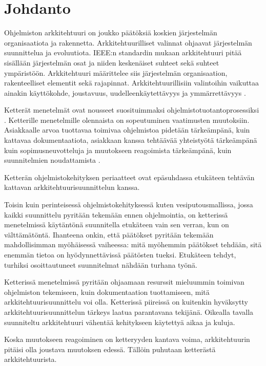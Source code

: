 \chapter{Johdanto}


Ohjelmiston arkkitehtuuri on joukko päätöksiä koskien järjestelmän organisaatiota ja rakennetta. Arkkitehtuurilliset valinnat ohjaavat järjestelmän suunnittelua ja evoluutiota. IEEE:n standardin\citep{jen_working_2000} mukaan arkkitehtuuri pitää sisällään järjestelmän osat ja niiden keskenäiset suhteet sekä suhteet ympäristöön. Arkkitehtuuri määrittelee siis järjestelmän organisaation, rakenteelliset elementit sekä rajapinnat. Arkkitehtuurillisiin valintoihin vaikuttaa ainakin käyttökohde, joustavuus, uudelleenkäytettävyys ja ymmärrettävyys \citep{kruchten2004rational}.

Ketterät menetelmät ovat nousseet suosituimmaksi ohjelmistotuotantoprosessiksi \citep{noauthor_14th_2020}. Ketterille menetelmille olennaista on sopeutuminen vaatimusten muutoksiin. Asiakkaalle arvoa tuottavaa toimivaa ohjelmistoa pidetään tärkeämpänä, kuin kattavaa dokumentaatiota, asiakkaan kanssa tehtäävää yhteistyötä tärkeämpänä kuin sopimusneuvotteluja ja muutokseen reagoimista tärkeämpänä, kuin suunnitelmien noudattamista \citep{fowler2001agile}.

Ketterän ohjelmistokehityksen periaatteet ovat epäsuhdassa etukäteen tehtävän kattavan arkkitehtuurisuunnittelun kanssa.

Toisin kuin perinteisessä ohjelmistokehityksessä kuten vesiputousmallissa, jossa kaikki suunnittelu pyritään tekemään ennen ohjelmointia, on ketterissä menetelmissä käytäntönä suunnitella etukäteen vain sen verran, kun on välttämätöntä. Ihanteena onkin, että päätökset pyritään tekemään mahdollisimman myöhäisessä vaiheessa: mitä myöhemmin päätökset tehdään, sitä enemmän tietoa on hyödynnettävissä päätösten tueksi. Etukäteen tehdyt, turhiksi osoittautuneet suunnitelmat nähdään turhana työnä.

Ketterissä menetelmissä pyritään ohjaamaan resurssit mieluummin toimivan ohjelmiston tekemiseen, kuin dokumentaation tuottamiseen, mitä arkkitehtuurisuunnittelu voi olla. Ketterissä piireissä on kuitenkin hyväksytty arkkitehtuurisuunnittelun tärkeys laatua parantavana tekijänä. Oikealla tavalla suunniteltu arkkitehtuuri vähentää kehitykseen käytettyä aikaa ja kuluja. 

Koska muutokseen reagoiminen on ketteryyden kantava voima, arkkitehtuurin pitäisi olla joustava muutoksen edessä. Tällöin puhutaan ketterästä arkkitehtuurista.

